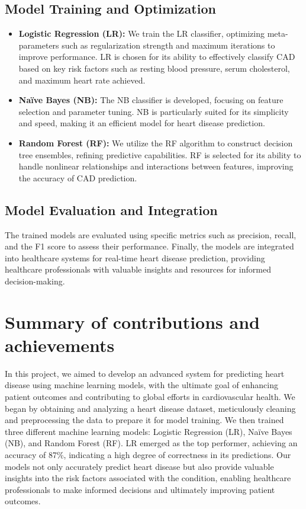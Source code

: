 \subsection{Model Training and Optimization}
\begin{itemize}
\item \textbf{Logistic Regression (LR):} We train the LR classifier, optimizing meta-parameters such as regularization strength and maximum iterations to improve performance. LR is chosen for its ability to effectively classify CAD based on key risk factors such as resting blood pressure, serum cholesterol, and maximum heart rate achieved.
\item \textbf{Naïve Bayes (NB):} The NB classifier is developed, focusing on feature selection and parameter tuning. NB is particularly suited for its simplicity and speed, making it an efficient model for heart disease prediction.
\item \textbf{Random Forest (RF):} We utilize the RF algorithm to construct decision tree ensembles, refining predictive capabilities. RF is selected for its ability to handle nonlinear relationships and interactions between features, improving the accuracy of CAD prediction.
\end{itemize}

\subsection{Model Evaluation and Integration}
The trained models are evaluated using specific metrics such as precision, recall, and the F1 score to assess their performance. Finally, the models are integrated into healthcare systems for real-time heart disease prediction, providing healthcare professionals with valuable insights and resources for informed decision-making.



\section{Summary of contributions and achievements} %
\label{sec:intro_sum_results} %
In this project, we aimed to develop an advanced system for predicting heart disease using machine learning models, with the ultimate goal of enhancing patient outcomes and contributing to global efforts in cardiovascular health. We began by obtaining and analyzing a heart disease dataset, meticulously cleaning and preprocessing the data to prepare it for model training. We then trained three different machine learning models: Logistic Regression (LR), Naïve Bayes (NB), and Random Forest (RF). LR emerged as the top performer, achieving an accuracy of 87\%, indicating a high degree of correctness in its predictions. Our models not only accurately predict heart disease but also provide valuable insights into the risk factors associated with the condition, enabling healthcare professionals to make informed decisions and ultimately improving patient outcomes.


